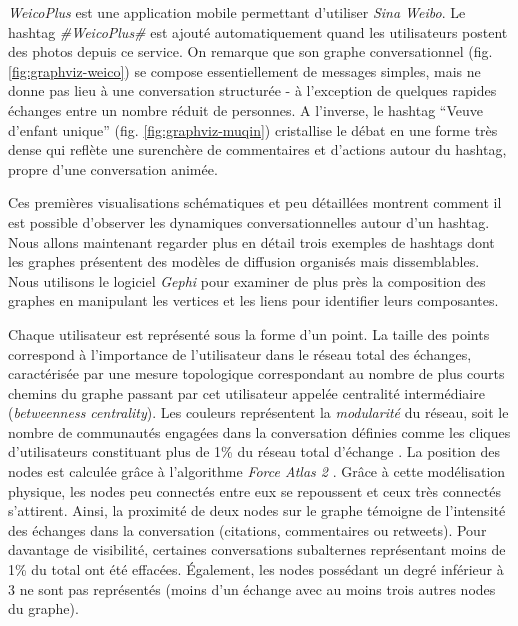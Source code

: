 \textit{WeicoPlus} est une application mobile permettant d{\textquoteright}utiliser \textit{Sina Weibo}. Le hashtag \textit{\#WeicoPlus\#} est ajouté automatiquement quand les utilisateurs postent des photos depuis ce service. On remarque que son graphe conversationnel (fig. \ref{fig:graphviz-weico})  se compose essentiellement de messages simples, mais ne donne pas lieu à une conversation structurée - à l{\textquoteright}exception de quelques rapides échanges entre un nombre réduit de personnes. A l{\textquoteright}inverse, le hashtag {\textquotedblleft}Veuve d{\textquoteright}enfant unique{\textquotedblright}  (fig. \ref{fig:graphviz-muqin}) cristallise le débat en une forme très dense qui reflète une surenchère de commentaires et d{\textquoteright}actions autour du hashtag, propre d{\textquoteright}une conversation animée.

Ces premières visualisations schématiques et peu détaillées montrent comment il est possible d'observer les dynamiques conversationnelles autour d'un hashtag. Nous allons maintenant regarder plus en détail trois exemples de hashtags dont les graphes présentent des modèles de diffusion organisés mais dissemblables. Nous utilisons le logiciel \textit{Gephi} \citep{Bastian2009} pour examiner de plus près la composition des graphes en manipulant les vertices et les liens pour identifier leurs composantes.

Chaque utilisateur est représenté sous la forme d{\textquoteright}un point. La taille des points correspond à l{\textquoteright}importance de l{\textquoteright}utilisateur dans le réseau total des échanges, caractérisée par une mesure topologique correspondant au nombre de plus courts chemins du graphe passant par cet utilisateur appelée centralité intermédiaire (\textit{betweenness centrality}). Les couleurs représentent la \textit{modularité }du réseau, soit le nombre de communautés engagées dans la conversation définies comme les cliques d{\textquoteright}utilisateurs constituant plus de 1\% du réseau total d{\textquoteright}échange \citep{Blondel2008}. La position des nodes est calculée gr\^ace à l{\textquoteright}algorithme \textit{Force Atlas 2} \citep{Bastian2009}. Grâce à cette modélisation physique, les nodes peu connectés entre eux se repoussent et ceux très connectés s{\textquoteright}attirent. Ainsi, la proximité de deux nodes sur le graphe témoigne de l'intensité des échanges dans la conversation (citations, commentaires ou retweets). Pour davantage de visibilité, certaines conversations subalternes représentant moins de 1\% du total ont été effacées. Également, les nodes possédant un degré inférieur à 3 ne sont pas représentés (moins d{\textquoteright}un échange avec au moins trois autres nodes du graphe).

